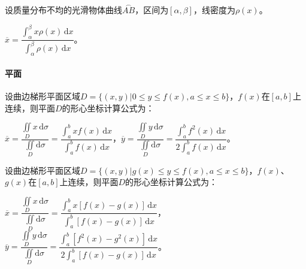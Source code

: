 \documentclass[UTF8, 12pt]{ctexart}
\begin{document}
设质量分布不均的光滑物体曲线$\overset{\frown}{AB}$，区间为$[\alpha,\beta]$，线密度为$\rho(x)$。

$\overline{x}=\dfrac{\int_\alpha^\beta x\rho(x)\,\textrm{d}x}{\int_\alpha^\beta\rho(x)\,\textrm{d}x}$。

\paragraph{平面} \leavevmode \medskip

设曲边梯形平面区域$D=\{(x,y)|0\leqslant y\leqslant f(x),a\leqslant x\leqslant b\}$，$f(x)$在$[a,b]$上连续，则平面$D$的形心坐标计算公式为：\medskip



$\overline{x}=\dfrac{\iint\limits_Dx\,\textrm{d}\sigma}{\iint\limits_D\textrm{d}\sigma}=\dfrac{\int_a^bxf(x)\,\textrm{d}x}{\int_a^bf(x)\,\textrm{d}x}$，$\overline{y}=\dfrac{\iint\limits_Dy\,\textrm{d}\sigma}{\iint\limits_D\textrm{d}\sigma}=\dfrac{\int_a^bf^2(x)\,\textrm{d}x}{2\int_a^bf(x)\,\textrm{d}x}$。

设曲边梯形平面区域$D=\{(x,y)|g(x)\leqslant y\leqslant f(x),a\leqslant x\leqslant b\}$，$f(x)$、$g(x)$在$[a,b]$上连续，则平面$D$的形心坐标计算公式为：\medskip



$\overline{x}=\dfrac{\iint\limits_Dx\,\textrm{d}\sigma}{\iint\limits_D\textrm{d}\sigma}=\dfrac{\int_a^bx[f(x)-g(x)]\,\textrm{d}x}{\int_a^b[f(x)-g(x)]\,\textrm{d}x}$，$\overline{y}=\dfrac{\iint\limits_Dy\,\textrm{d}\sigma}{\iint\limits_D\textrm{d}\sigma}=\dfrac{\int_a^b[f^2(x)-g^2(x)]\,\textrm{d}x}{2\int_a^b[f(x)-g(x)]\,\textrm{d}x}$。
\end{document}
